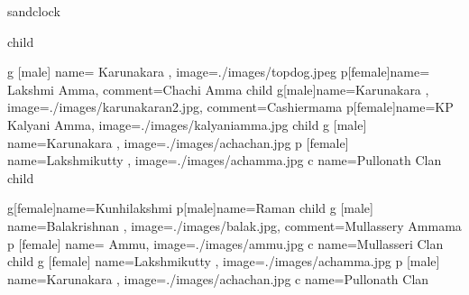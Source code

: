 \documentclass{article}
\begin{document}
\begin{landscape}
\begin{genealogypicture} [
processing=database,
database format=medium marriage below,
node size=2.4cm,
level size=3.5cm,
level distance=6mm,
list separators hang,
name font=\bfseries,
surn code={\textcolor{red!50!black}{#1}},
place text={\newline}{},
date format=d/mon/yyyy,
tcbset={male/.style={colframe=blue,colback=blue!5},
female/.style={colframe=red,colback=red!5}},
box={fit basedim=7pt,boxsep=2pt,segmentation style=solid,
halign=left,before upper=\parskip1pt,
\gtrDBsex,drop fuzzy shadow,
if image defined={add to width=25mm,right=25mm,
underlay={\begin{tcbclipinterior}\path[fill overzoom DBimage]
([xshift=-24mm]interior.south east) rectangle (interior.north east);
\end{tcbclipinterior}},
}{},
},
]

sandclock {
	child {
  		g [male]  {name={ Karunakara }, image={./images/topdog.jpeg}}
  		p[female]{name={ Lakshmi Amma}, comment={Chachi Amma}}
  		child {
  			 g[male]{name=Karunakara , image={./images/karunakaran2.jpg}, comment={Cashiermama}}
   			p[female]{name={KP Kalyani Amma}, image={./images/kalyaniamma.jpg}}
   			child {
    				g [male] {name=Karunakara , image={./images/achachan.jpg}}
    				p [female] {name=Lakshmikutty , image={./images/achamma.jpg}}
				c {name=Pullonath Clan}
   			}
  		}
  		child {
   			g[female]{name={Kunhilakshmi }}
   			p[male]{name={Raman }}
   			child {
    				g [male] {name=Balakrishnan  , image={./images/balak.jpg}, comment={Mullassery Ammama}}
    				p [female] {name= Ammu, image={./images/ammu.jpg}}
				c {name=Mullasseri Clan}
   			}
			child {
    				g [female] {name=Lakshmikutty , image={./images/achamma.jpg}}
				p [male] {name=Karunakara , image={./images/achachan.jpg}}
				c {name=Pullonath Clan}
   			}

}}}
\end{genealogypicture}
\end{landscape}
\end{document}
